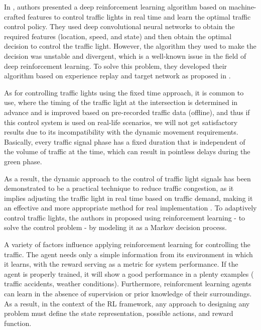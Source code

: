 \documentclass[conference]{IEEEtran}
\begin{document}
In \cite{Adaptive}, authors presented a deep reinforcement learning\cite{RL-Intro} algorithm based on machine-crafted features to control traffic lights in real time and learn the optimal traffic control policy. They used deep convolutional neural networks to obtain the required features (location, speed, and state) and then obtain the optimal decision to control the traffic light. However, the algorithm they used to make the decision was unstable and divergent, which is a well-known issue in the field of deep reinforcement learning. To solve this problem, they developed their algorithm based on experience replay and target network as proposed in \cite{Human-level}.

As for controlling traffic lights using the fixed time approach, it is common to use, where the timing of the traffic light at the intersection is determined in advance and is improved based on pre-recorded traffic data (offline), and thus if this control system is used on real-life scenarios, we will not get satisfactory results due to its incompatibility with the dynamic movement requirements. Basically, every traffic signal phase has a fixed duration that is independent of the volume of traffic at the time, which can result in pointless delays during the green phase\cite{Deep}. 

As a result, the dynamic approach to the control of traffic light signals has been demonstrated to be a practical technique to reduce traffic congestion, as it implies adjusting the traffic light in real time based on traffic demand, making it an effective and more appropriate method for real implementation \cite{experimental,Back-pressure}. To adaptively control traffic lights, the authors in \cite{experimental,function} proposed using reinforcement learning - to solve the control problem - by modeling it as a Markov decision process\cite{RL-Intro}.

A variety of factors \cite{traffic-survey} influence applying reinforcement learning for controlling the traffic. The agent needs only a simple information from its environment in which it learns, with the reward serving as a metric for system performance. If the agent is properly trained, it will show a good performance in a plenty examples ( traffic accidents, weather conditions). Furthermore, reinforcment learning agents can learn in the absence of supervision or prior knowledge of their surroundings. As a result, in the context of the RL framework, any approach to designing any problem must define the state representation, possible actions, and reward function.
\end{document}

